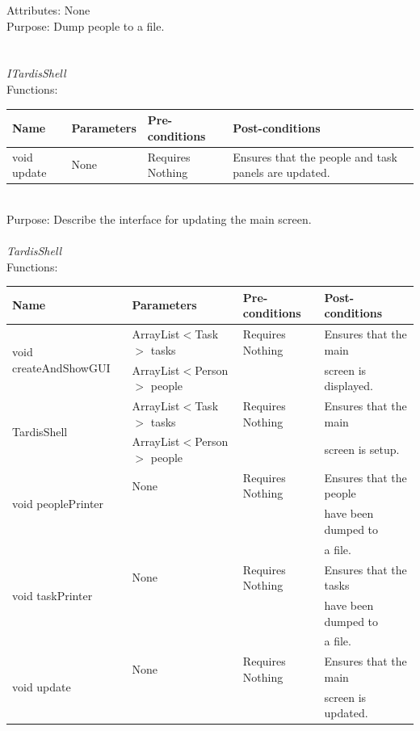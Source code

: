 Attributes: None\\
Purpose: Dump people to a file.\\
\\
\\
\emph{ITardisShell}\\
Functions:\\
\begin{tabular}{| l | l | l | l |}
\hline
Name & Parameters & Pre-conditions & Post-conditions\\
\hline
void update & None & Requires Nothing & Ensures that the people and task panels are updated.
\\
\hline
\end{tabular}\\
Purpose: Describe the interface for updating the main screen.
\\
\\
\emph{TardisShell}\\
Functions:\\
\begin{tabular}{| l | l | l | l |}
\hline
Name & Parameters & Pre-conditions & Post-conditions\\
\hline
\multirow{2}{*}{void createAndShowGUI} & ArrayList$<$Task$>$ tasks        & Requires Nothing & Ensures that the main\\ 
			                                 & ArrayList$<$Person$>$ people &                             & screen is displayed. 
\\
\hline
\multirow{2}{*}{TardisShell} & ArrayList$<$Task$>$ tasks       & Requires Nothing & Ensures that the main\\ 
			          & ArrayList$<$Person$>$ people &                             & screen is setup. 
\\
\hline
\multirow{2}{*}{void peoplePrinter} & None & Requires Nothing & Ensures that the people\\ 
			                       &          &                             & have been dumped to\\
			                       &          &                             & a file.
\\
\hline
\multirow{2}{*}{void taskPrinter} & None & Requires Nothing & Ensures that the tasks\\ 
                       	                               &          &                             & have been dumped to\\
                                                       &          &                             & a file. 
\\
\hline
\multirow{2}{*}{void update} & None & Requires Nothing & Ensures that the main\\ 
			            &           &                             & screen is updated. 
\\
\hline
\end{tabular}\\
